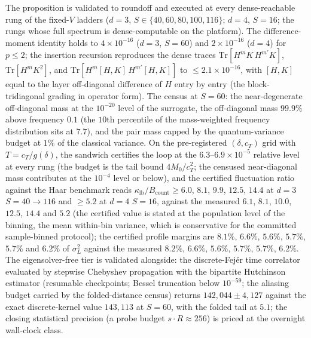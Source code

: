 The proposition is validated to roundoff and executed at every
dense-reachable rung of the fixed-$V$ ladders ($d=3$, $S\in\{40,60,80,
100,116\}$; $d=4$, $S=16$; the rungs whose full spectrum is dense-computable
on the platform).  The difference-moment identity holds to
$4\times10^{-16}$ ($d=3$, $S=60$) and $2\times10^{-16}$ ($d=4$) for
$p\le2$; the insertion recursion reproduces the dense traces
$\mathrm{Tr}[H^{m}K\,H^{m'}K]$, $\mathrm{Tr}[H^{m}K^{2}]$, and
$\mathrm{Tr}[H^{m}[H,K]\,H^{m'}[H,K]]$ to $\le2.1\times10^{-16}$, with
$[H,K]$ equal to the layer off-diagonal difference of $H$ entry by entry
(the block-tridiagonal grading in operator form).  The census at
$S=60$: the near-degenerate off-diagonal mass at the $10^{-20}$ level of
the surrogate, the off-diagonal mass $99.9\%$ above frequency $0.1$
(the $10$th percentile of the mass-weighted frequency distribution sits
at $7.7$), and the pair mass capped by the quantum-variance budget at
$1\%$ of the classical variance.  On the pre-registered
$(\delta,c_T)$ grid with $T=c_T/g(\delta)$, the sandwich certifies the
loop at the $6.3$--$6.9\times10^{-5}$ relative level at every rung
(the budget is the tail bound $4M_0/c_T^{2}$; the censused near-diagonal
mass contributes at the $10^{-4}$ level or below), and the certified
fluctuation ratio against the Haar benchmark reads
$\kappa_{\mathrm{lb}}/B_{\mathrm{count}}\ge6.0$, $8.1$, $9.9$, $12.5$,
$14.4$ at $d=3$ $S=40\to116$ and $\ge5.2$ at $d=4$ $S=16$, against the
measured $6.1$, $8.1$, $10.0$, $12.5$, $14.4$ and $5.2$ (the certified
value is stated at the population level of the binning, the mean
within-bin variance, which is conservative for the committed
sample-binned protocol); the certified profile margins are
$8.1\%$, $6.6\%$, $5.6\%$, $5.7\%$, $5.7\%$ and $6.2\%$ of
$\sigma_L^{2}$ against the measured $8.2\%$, $6.6\%$, $5.6\%$, $5.7\%$,
$5.7\%$, $6.2\%$.  The eigensolver-free tier is validated alongside: the
discrete-Fej\'er time correlator evaluated by stepwise Chebyshev
propagation with the bipartite Hutchinson estimator (resumable
checkpoints; Bessel truncation below $10^{-59}$; the aliasing budget
carried by the folded-distance census) returns $142{,}044\pm4{,}127$
against the exact discrete-kernel value $143{,}113$ at $S=60$, with the
folded tail at $5.1$; the closing statistical precision (a probe budget
$s\!\cdot\!R\approx256$) is priced at the overnight wall-clock class.


